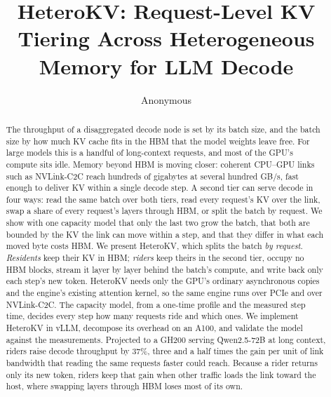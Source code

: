 \documentclass[10pt,twocolumn,letterpaper]{article}
\title{\textbf{HeteroKV: Request-Level KV Tiering Across Heterogeneous Memory for LLM Decode}}
\author{Anonymous}
\date{}
\newif\ifdraft\drafttrue
\newcommand{\torun}[1]{\textcolor{red}{[\textbf{To run:} #1]}}
\newcommand{\torun}[1]{\GenericError{}{UNRESOLVED MEASUREMENT}{}{}}
\newcommand{\sysname}{HeteroKV}
\begin{document}
\maketitle
\begin{abstract}
The throughput of a disaggregated decode node is set by its batch size, and the
batch size by how much KV cache fits in the HBM that the model weights leave
free. For large models this is a handful of long-context requests, and most of
the GPU's compute sits idle. Memory beyond HBM is moving closer: coherent
CPU--GPU links such as NVLink-C2C reach hundreds of gigabytes at several
hundred GB/s, fast enough to deliver KV within a single decode step. A second
tier can serve decode in four ways: read the same batch over both tiers, read
every request's KV over the link, swap a share of every request's layers
through HBM, or split the batch by request. We show with one capacity model
that only the last two grow the batch, that both are bounded by the KV the
link can move within a step, and that they differ in what each moved byte
costs HBM. We present \sysname{}, which splits the batch \emph{by request}.
\emph{Residents} keep their KV in HBM; \emph{riders} keep theirs in the second
tier, occupy no HBM blocks, stream it layer by layer behind the batch's
compute, and write back only each step's new token. \sysname{} needs only the GPU's ordinary
asynchronous copies and the engine's existing attention kernel, so the same
engine runs over PCIe and over NVLink-C2C. The capacity model, from a one-time
profile and the measured step time, decides every step how many requests ride
and which ones. We implement \sysname{} in vLLM, decompose its overhead on an
A100, and validate the model against the measurements. Projected to a GH200 serving
Qwen2.5-72B at long context, riders raise decode throughput by 37\%, three
and a half times the gain per unit of link bandwidth that reading the same
requests faster could reach. Because a rider returns only its new token, riders keep
that gain when other traffic loads the link toward the host, where swapping
layers through HBM loses most of its own.
\end{abstract}
\ifdraft\linenumbers\fi
\end{document}
